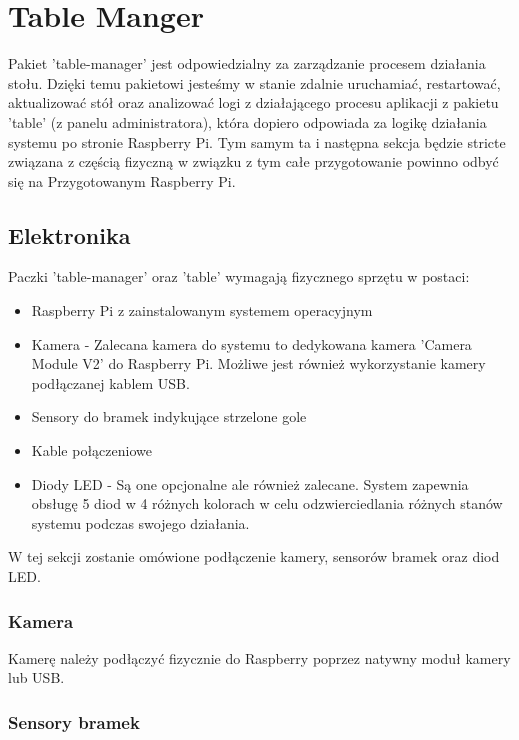 \section{Table Manger}
Pakiet 'table-manager' jest odpowiedzialny za zarządzanie procesem działania stołu. Dzięki temu pakietowi jesteśmy w stanie zdalnie uruchamiać, restartować, aktualizować stół oraz analizować logi z działającego procesu aplikacji z pakietu 'table' (z panelu administratora), która dopiero odpowiada za logikę działania systemu po stronie Raspberry Pi. Tym samym ta i następna sekcja będzie stricte związana z częścią fizyczną w związku z tym całe przygotowanie powinno odbyć się na Przygotowanym Raspberry Pi.

\subsection{Elektronika}

Paczki 'table-manager' oraz 'table' wymagają fizycznego sprzętu w postaci:

\begin{itemize}
	\item Raspberry Pi z zainstalowanym systemem operacyjnym
	\item Kamera - Zalecana kamera do systemu to dedykowana kamera 'Camera Module V2' do Raspberry Pi. Możliwe jest również wykorzystanie kamery podłączanej kablem USB.
	\item Sensory do bramek indykujące strzelone gole
	\item Kable połączeniowe
	\item Diody LED - Są one opcjonalne ale również zalecane. System zapewnia obsługę 5 diod w 4 różnych kolorach w celu odzwierciedlania różnych stanów systemu podczas swojego działania.
\end{itemize}

W tej sekcji zostanie omówione podłączenie kamery, sensorów bramek oraz diod LED.

\subsubsection{Kamera}

Kamerę należy podłączyć fizycznie do Raspberry poprzez natywny moduł kamery lub USB.

\subsubsection{Sensory bramek}

